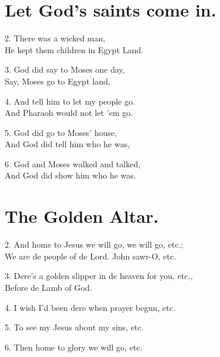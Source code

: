 \documentclass[a5paper,10pt]{book}
\begin{document}
\newpage
\section{Let God's saints come in.}
\thispagestyle{empty}

\begin{song}
\end{song}

\begin{stanza}
\item[2.]
  There was a wicked man,\\
  He kept them children in Egypt Land.
\item[3.]
  God did say to Moses one day,\\
  Say, Moses go to Egypt land,
\item[4.]
  And tell him to let my people go.\\
  And Pharaoh would not let 'em go.
\item[5.]
  God did go to Moses' house,\\
  And God did tell him who he was,
\item[6.]
  God and Moses walked and talked,\\
  And God did show him who he was.
\end{stanza}


\newpage
\section{The Golden Altar.}
\thispagestyle{empty}

\begin{song}
\end{song}

\begin{stanza}
\item[2.]
  And home to Jesus we will go, we will go, etc.;\\
  We are de people of de Lord.
  John sawr-O, etc.
\item[3.]
  Dere's a golden slipper in de heaven for you, etc.,\\
  Before de Lamb of God.
\item[4.]
  I wish I'd been dere when prayer begun, etc.
\item[5.]
  To see my Jesus about my sins, etc.
\item[6.]
  Then home to glory we will go, etc.
\end{stanza}
\end{document}
